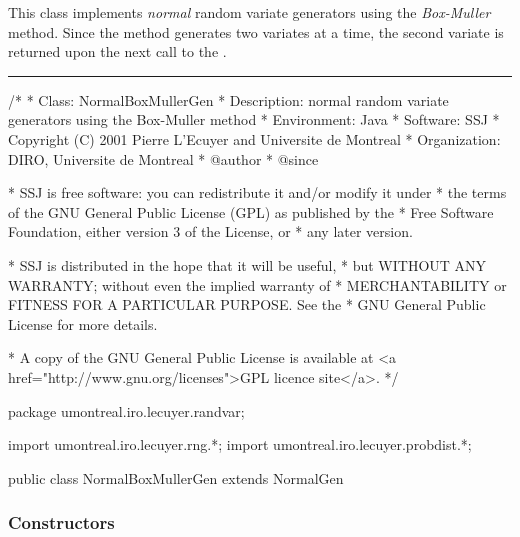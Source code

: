 
This class implements {\em normal\/} random variate generators using
 the {\em Box-Muller\/} method. 
Since the method generates two variates at a time, 
the second variate is returned upon the next call to the .


\bigskip\hrule

\begin{code}
\begin{hide}
/*
 * Class:        NormalBoxMullerGen
 * Description:  normal random variate generators using the Box-Muller method
 * Environment:  Java
 * Software:     SSJ 
 * Copyright (C) 2001  Pierre L'Ecuyer and Universite de Montreal
 * Organization: DIRO, Universite de Montreal
 * @author       
 * @since

 * SSJ is free software: you can redistribute it and/or modify it under
 * the terms of the GNU General Public License (GPL) as published by the
 * Free Software Foundation, either version 3 of the License, or
 * any later version.

 * SSJ is distributed in the hope that it will be useful,
 * but WITHOUT ANY WARRANTY; without even the implied warranty of
 * MERCHANTABILITY or FITNESS FOR A PARTICULAR PURPOSE.  See the
 * GNU General Public License for more details.

 * A copy of the GNU General Public License is available at
   <a href="http://www.gnu.org/licenses">GPL licence site</a>.
 */
\end{hide}
package umontreal.iro.lecuyer.randvar;\begin{hide}
import umontreal.iro.lecuyer.rng.*;
import umontreal.iro.lecuyer.probdist.*;
\end{hide}

public class NormalBoxMullerGen extends NormalGen \begin{hide} {
   private boolean available = false;
   private double[] variates = new double[2];
   private static double[] staticVariates = new double[2];
   // used by polar method which calculate always two random values; 
  
\end{hide}\end{code}

\subsubsection* {Constructors}


